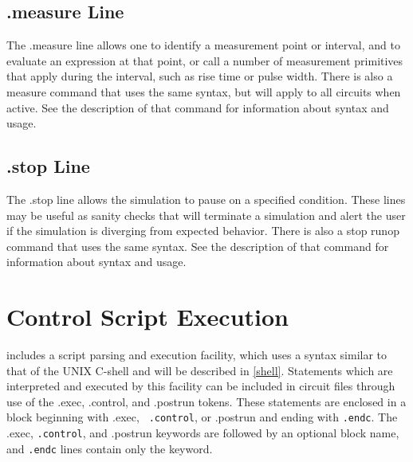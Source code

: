 \subsection{{\vt .measure} Line}

The {\vt .measure} line allows one to identify a measurement point or
interval, and to evaluate an expression at that point, or call a
number of measurement primitives that apply during the interval, such
as rise time or pulse width.  There is also a {\cb measure} command
that uses the same syntax, but will apply to all circuits when active. 
See the description of that command for information about syntax and
usage.

\subsection{{\vt .stop} Line}

The {\vt .stop} line allows the simulation to pause on a specified
condition.  These lines may be useful as sanity checks that will
terminate a simulation and alert the user if the simulation is
diverging from expected behavior.  There is also a {\cb stop} runop
command that uses the same syntax.  See the description of that
command for information about syntax and usage.


\section{Control Script Execution}


{\WRspice} includes a script parsing and execution facility, which
uses a syntax similar to that of the UNIX C-shell and will be
described in \ref{shell}.  Statements which are interpreted and
executed by this facility can be included in circuit files through use
of the {\vt .exec}, {\vt .control}, and {\vt .postrun} tokens.  These
statements are enclosed in a block beginning with {\vt .exec}, {\tt
.control}, or {\vt .postrun} and ending with {\tt .endc}.  The {\vt
.exec}, {\tt.control}, and {\vt .postrun} keywords are followed by an
optional block name, and {\tt .endc} lines contain only the keyword.


